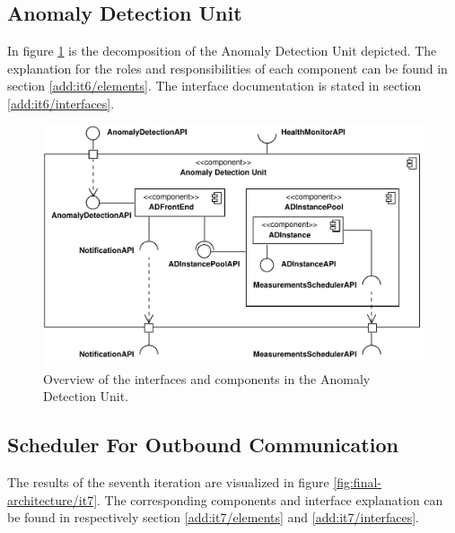 \subsection{Anomaly Detection Unit}

\npar In figure \ref{fig:final-architecture/it6} is the decomposition of the
Anomaly Detection Unit depicted. The explanation for the roles and
responsibilities of each component can be found in section
\ref{add:it6/elements}. The interface documentation is stated in section
\ref{add:it6/interfaces}.

\begin{figure}
	\begin{centering}
		\includegraphics[width=\textwidth]{figs/add-it6-interfaces.pdf}
		\caption{Overview of the interfaces and components in the Anomaly Detection
		Unit.}
		\label{fig:final-architecture/it6}
	\end{centering}
\end{figure}

\subsection{Scheduler For Outbound Communication}

\npar The results of the seventh iteration are visualized in figure
\ref{fig:final-architecture/it7}. The corresponding components and interface
explanation can be found in respectively section \ref{add:it7/elements} and
\ref{add:it7/interfaces}.

